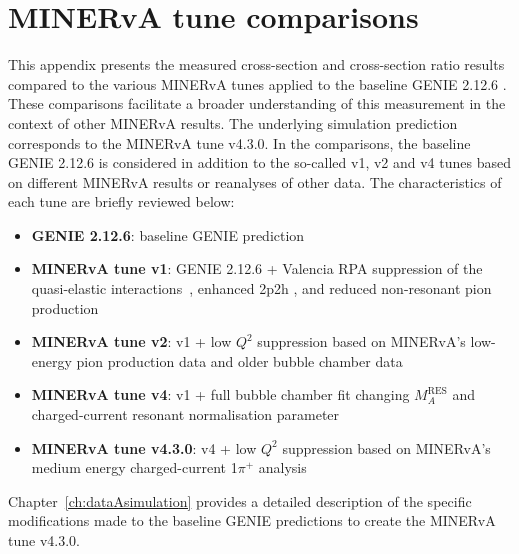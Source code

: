 \chapter{MINERvA tune comparisons}

\label{ch:appendix_tuneComparisons}

This appendix presents the measured cross-section and cross-section ratio results compared to the various MINERvA tunes applied to the baseline GENIE 2.12.6 \cite{genie_ANDREOPOULOS201087,genie_andreopoulos2015}. These comparisons facilitate a broader understanding of this measurement in the context of other MINERvA results. The underlying simulation prediction corresponds to the MINERvA tune v4.3.0. In the comparisons, the baseline GENIE 2.12.6 is considered in addition to the so-called v1, v2 and v4 tunes based on different MINERvA results or reanalyses of other data. The characteristics of each tune are briefly reviewed below:
\begin{itemize}
    \item \textbf{GENIE 2.12.6}: baseline GENIE prediction
    \item \textbf{MINERvA tune v1}: GENIE 2.12.6 + Valencia RPA suppression of the quasi-elastic interactions~\cite{RPANieves2004_PhysRevC.70.055503, Rodrigues2016_PhysRevLett.116.071802, gran2017model}, enhanced 2p2h \cite{2p2hNieves2011_PhysRevC.83.045501,2p2hGran2013_PhysRevD.88.113007,2p2hschwehr2017genie,Rodrigues2016_PhysRevLett.116.071802, Gran2018_PhysRevLett.120.221805}, and reduced non-resonant pion production \cite{pion_Rodrigues_2016}
    \item \textbf{MINERvA tune v2}: v1 + low $Q^2$ suppression based on MINERvA's low-energy pion production data and older bubble chamber data \cite{PhysRevD.100.072005}
    \item \textbf{MINERvA tune v4}: v1 + full bubble chamber fit changing $M_{A}^{\text{RES}}$ and charged-current resonant normalisation parameter \cite{pion_Rodrigues_2016}
    \item \textbf{MINERvA tune v4.3.0}: v4 + low $Q^2$ suppression based on MINERvA's medium energy charged-current 1$\pi^+$ analysis \cite{Bercellie2023_PhysRevLett.131.011801}
\end{itemize}
Chapter~\ref{ch:dataAsimulation} provides a detailed description of the specific modifications made to the baseline GENIE predictions to create the MINERvA tune v4.3.0.


